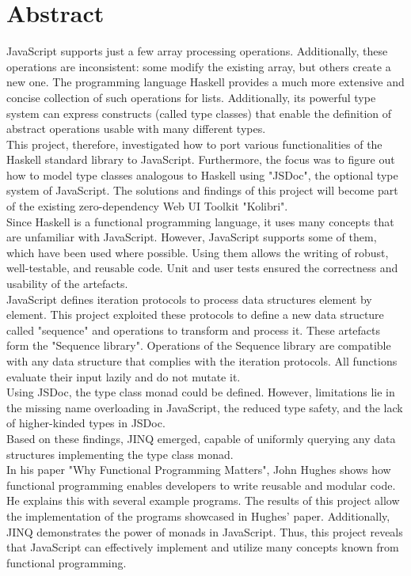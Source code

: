 \chapter*{Abstract}
\thispagestyle{empty}
JavaScript supports just a few array processing operations.
Additionally, these operations are inconsistent: some modify the existing
array, but others create a new one. The programming language Haskell provides a
much more extensive and concise collection of such operations for
lists. Additionally, its powerful type system can express
constructs (called type classes) that enable the definition of abstract
operations usable with many different types.\\ 
This project, therefore, investigated how to port various functionalities of
the Haskell standard library to JavaScript. Furthermore, the focus was to
figure out how to model type classes analogous to Haskell using "JSDoc", the
optional type system of JavaScript. The solutions and
findings of this project will become part of the existing zero-dependency Web
UI Toolkit "Kolibri". \\
Since Haskell is a functional programming language, it uses many concepts that
are unfamiliar with JavaScript. However, JavaScript supports some of them,
which have been used where possible. Using them allows the writing
of robust, well-testable, and reusable code. Unit and user tests ensured the
correctness and usability of the artefacts. \\
JavaScript defines iteration protocols to process data structures element by
element. This project exploited these protocols to define a new data structure
called "sequence" and operations to transform and process it. These artefacts
form the "Sequence library". Operations of the Sequence library are compatible
with any data structure that complies with the iteration protocols.
All functions evaluate their input lazily and do not mutate it.\\
Using JSDoc, the type class monad could be defined. However, limitations lie in
the missing name overloading in JavaScript, the reduced type safety, and the
lack of higher-kinded types in JSDoc. \\
Based on these findings, JINQ emerged, capable of uniformly querying any data
structures implementing the type class monad.\\
In his paper "Why Functional Programming Matters", John Hughes shows how
functional programming enables developers to write reusable and modular
code. He explains this with several example programs.
The results of this project allow the implementation of the programs showcased
in Hughes' paper. Additionally, JINQ demonstrates the power of monads in
JavaScript. Thus, this project reveals that JavaScript can effectively
implement and utilize many concepts known from functional programming.
